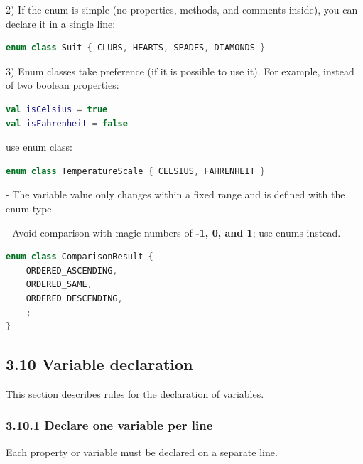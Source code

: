 2) If the enum is simple (no properties, methods, and comments inside), you can declare it in a single line:

\begin{lstlisting}[language=Kotlin]
enum class Suit { CLUBS, HEARTS, SPADES, DIAMONDS }
\end{lstlisting}


3) Enum classes take preference (if it is possible to use it). For example, instead of two boolean properties:



\begin{lstlisting}[language=Kotlin]
val isCelsius = true
val isFahrenheit = false
\end{lstlisting}


use enum class:



\begin{lstlisting}[language=Kotlin]
enum class TemperatureScale { CELSIUS, FAHRENHEIT }
\end{lstlisting}


- The variable value only changes within a fixed range and is defined with the enum type. 

- Avoid comparison with magic numbers of \textbf{-1, 0, and 1}; use enums instead.



\begin{lstlisting}[language=Kotlin]
enum class ComparisonResult {
    ORDERED_ASCENDING,
    ORDERED_SAME,
    ORDERED_DESCENDING,
    ;
}
\end{lstlisting}


\subsection*{\textbf{3.10 Variable declaration}}

\label{sec:3.10}

This section describes rules for the declaration of variables.

\subsubsection*{\textbf{3.10.1 Declare one variable per line}}
\leavevmode\newline

\label{sec:3.10.1}



Each property or variable must be declared on a separate line. 



